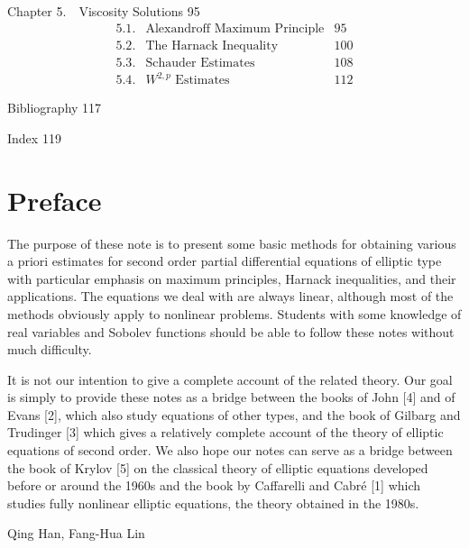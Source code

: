 Chapter 5.\ \ Viscosity Solutions \hfill 95
\[
\begin{array}{llr}
5.1.&\text{Alexandroff Maximum Principle}&95\\
5.2.&\text{The Harnack Inequality}&100\\
5.3.&\text{Schauder Estimates}&108\\
5.4.&W^{2,p}\text{ Estimates}&112
\end{array}
\]

Bibliography \hfill 117

Index \hfill 119

\chapter*{Preface}

The purpose of these note is to present some basic methods for obtaining various
a priori estimates for second order partial differential equations of elliptic type
with particular emphasis on maximum principles, Harnack inequalities, and their
applications. The equations we deal with are always linear, although most of the
methods obviously apply to nonlinear problems. Students with some knowledge of
real variables and Sobolev functions should be able to follow these notes without
much difficulty.

It is not our intention to give a complete account of the related theory. Our
goal is simply to provide these notes as a bridge between the books of John [4] and
of Evans [2], which also study equations of other types, and the book of Gilbarg
and Trudinger [3] which gives a relatively complete account of the theory of elliptic
equations of second order. We also hope our notes can serve as a bridge between
the book of Krylov [5] on the classical theory of elliptic equations developed before
or around the 1960s and the book by Caffarelli and Cabré [1] which studies fully
nonlinear elliptic equations, the theory obtained in the 1980s.

\hfill Qing Han, Fang-Hua Lin
